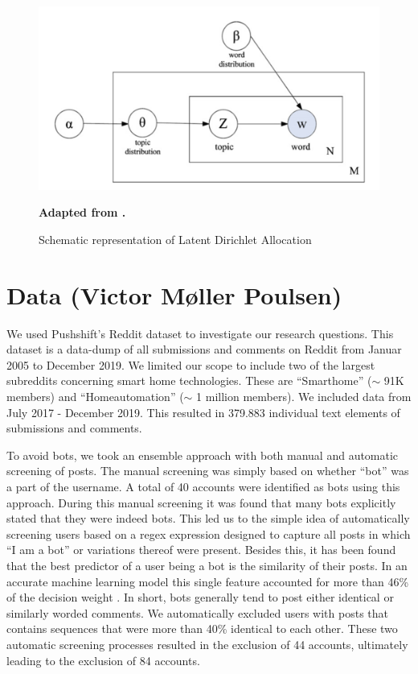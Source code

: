 \documentclass{article}
\begin{document}
\begin{figure}[H]
    \begin{centering}
    \includegraphics[width = \textwidth]{../Figure/cao_juan.PNG}
    \caption{Schematic representation of Latent Dirichlet Allocation}
    \end{centering}
    \begin{footnotesize} 
        \begin{center}
            \textbf{Adapted from .}
        \end{center}
    \end{footnotesize}
\end{figure}

    \section{Data (Victor Møller Poulsen)}
    We used Pushshift’s Reddit dataset \cite{baumgartner2020pushshift} to investigate our research questions. This dataset is a data-dump of all submissions and comments on Reddit from Januar 2005 to December 2019. We limited our scope to include two of the largest subreddits concerning smart home technologies. These are “Smarthome” ($\sim$ 91K members) and “Homeautomation” ($\sim$ 1 million members). We included data from July 2017 - December 2019. This resulted in 379.883 individual text elements of submissions and comments. 

To avoid bots, we took an ensemble approach with both manual and automatic screening of posts. The manual screening was simply based on whether “bot” was a part of the username. A total of 40 accounts were identified as bots using this approach. During this manual screening it was found that many bots explicitly stated that they were indeed bots. This led us to the simple idea of automatically screening users based on a regex expression designed to capture all posts in which “I am a bot” or variations thereof were present. Besides this, it has been found \cite{skowronski_identifying_2019} that the best predictor of a user being a bot is the similarity of their posts. In an accurate machine learning model this single feature accounted for more than 46\% of the decision weight \cite{skowronski_identifying_2019}. In short, bots generally tend to post either identical or similarly worded comments. We automatically excluded users with posts that contains sequences that were more than 40\% identical to each other. These two automatic screening processes resulted in the exclusion of 44 accounts, ultimately leading to the exclusion of 84 accounts. 
\end{document}
